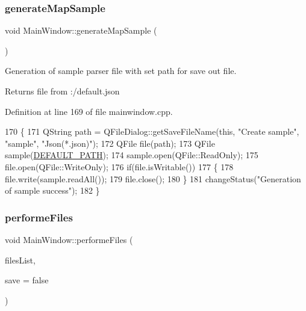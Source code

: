 \subsubsection{\texorpdfstring{generate\+Map\+Sample}{generateMapSample}}
{\footnotesize\ttfamily void Main\+Window\+::generate\+Map\+Sample (\begin{DoxyParamCaption}{ }\end{DoxyParamCaption})\hspace{0.3cm}{\ttfamily [slot]}}

Generation of sample parser file with set path for save out file. \begin{DoxyReturn}{Returns}
file from \+:/default.json 
\end{DoxyReturn}


Definition at line 169 of file mainwindow.\+cpp.


\begin{DoxyCode}
170 \{
171     QString path = QFileDialog::getSaveFileName(\textcolor{keyword}{this}, \textcolor{stringliteral}{"Create sample"}, \textcolor{stringliteral}{"sample"}, \textcolor{stringliteral}{"Json(*.json)"});
172     QFile file(path);
173     QFile sample(\hyperlink{mainwindow_8h_a72c1937b26ce9a87266ca6c802b047a0}{DEFAULT\_PATH});
174     sample.open(QFile::ReadOnly);
175     file.open(QFile::WriteOnly);
176     \textcolor{keywordflow}{if}(file.isWritable())
177     \{
178         file.write(sample.readAll());
179         file.close();
180     \}
181     changeStatus(\textcolor{stringliteral}{"Generation of sample success"});
182 \}
\end{DoxyCode}
\mbox{\label{class_main_window_a48108540b64f60b2785c397cee553fbf}} 
\subsubsection{\texorpdfstring{performe\+Files}{performeFiles}}
{\footnotesize\ttfamily void Main\+Window\+::performe\+Files (\begin{DoxyParamCaption}\item[{Q\+String\+List}]{files\+List,  }\item[{bool}]{save = {\ttfamily false} }\end{DoxyParamCaption})\hspace{0.3cm}{\ttfamily [slot]}}

